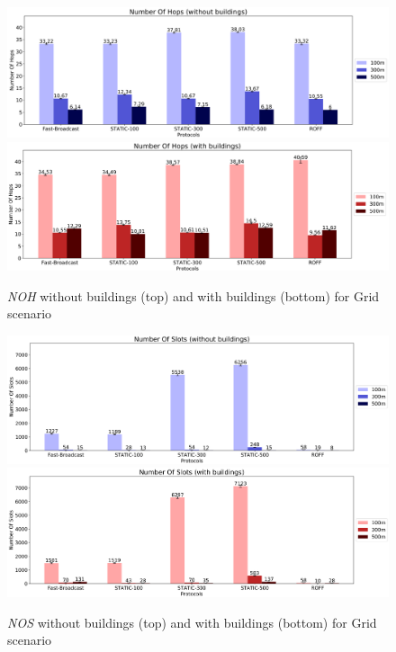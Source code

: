 		\begin{figure}[H]
			\centering
			\includegraphics[width=1.0\textwidth]{immagini/grid-300/b0/noh}
			\includegraphics[width=1.0\textwidth]{immagini/grid-300/b1/noh}
			\caption{\textit{NOH} without buildings (top) and with buildings (bottom) for Grid scenario}
			\label{fig:grid-noh}
		\end{figure}
	
		\begin{figure}[H]
			\centering
			\includegraphics[width=1.0\textwidth]{immagini/grid-300/b0/nos}
			\includegraphics[width=1.0\textwidth]{immagini/grid-300/b1/nos}
			\caption{\textit{NOS} without buildings (top) and with buildings (bottom) for Grid scenario}
			\label{fig:grid-nos}
		\end{figure}
	
